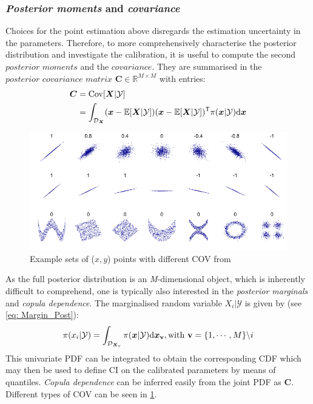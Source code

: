 \subsubsection{\textit{Posterior moments} and \textit{covariance}}
Choices for the point estimation above disregards the estimation uncertainty in the parameters. Therefore, to more comprehensively characterise the posterior distribution and investigate the calibration, it is useful to compute the second $\textit{posterior moments}$ and the $\textit{covariance}$. They are summarised in the $\textit{posterior covariance matrix}$ $\boldsymbol{C} \in \mathbb{R}^{M \times M}$ with entries:
\begin{equation}
    \label{eq: COV}
    \begin{aligned}
    \boldsymbol{C}  &= {\rm{Cov}}[\boldsymbol{X}|\mathcal{Y}] \\
            &=\int_{\mathcal{D}_{\boldsymbol{X}}} 
            (\boldsymbol{x} - \mathbb{E}[\boldsymbol{X}|\mathcal{Y}])(\boldsymbol{x} - \mathbb{E}[\boldsymbol{X}|\mathcal{Y}])^{\mathsf{T}} \pi(\boldsymbol{x}|\mathcal{Y}) {\rm{d}} \boldsymbol{x} 
    \end{aligned}  
\end{equation}
\begin{figure}[htbp]
    \centering
    \includegraphics[width = 140mm]{Figures/figure-COV.pdf}
\caption{Example sets of ($x,y$) points with different \acrshort{COV} from \cite{Wikipedia}}
    \label{fig: COV}
\end{figure}
As the full posterior distribution is an \textit{M}-dimensional object, which is inherently difficult to comprehend, one is typically also interested in the \textit{posterior marginals} and \textit{copula dependence}. The marginalised random variable $X_{i}|\mathcal{Y}$ is given by (see \cref{eq: Margin_Post}):
\begin{equation}
    \label{eq: Margin_Post}
    \pi(x_{i}|\mathcal{Y}) = \int_{\mathcal{D}_{\boldsymbol{X}_{\rm{\boldsymbol{v}}}}}
          \pi(\boldsymbol{x}|\mathcal{Y}){\rm{d}} \boldsymbol{x_{\rm{\boldsymbol{v}}}}, {\rm{with}} \ \boldsymbol{\mathrm{v}} = \{1,\cdots,M\} \backslash i  
\end{equation}
This univariate \acrshort{PDF} can be integrated to obtain the corresponding \acrfull{CDF} which may then be used to define \acrfull{CI} on the calibrated parameters by means of quantiles. \textit{Copula dependence} can be inferred easily from the joint \acrshort{PDF} as $\boldsymbol{C}$. Different types of \acrshort{COV} can be seen in \cref{fig: COV}.

